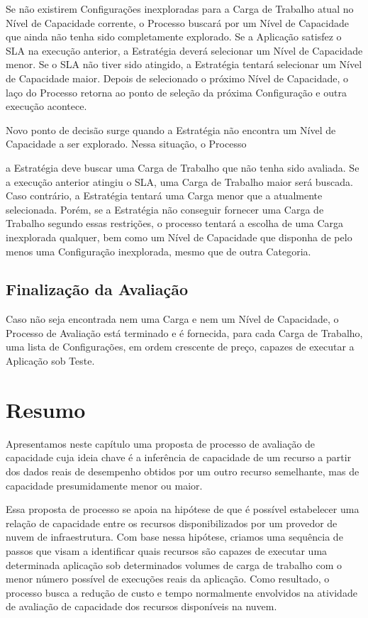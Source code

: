 Se não existirem Configurações inexploradas para a Carga de Trabalho atual no
Nível de Capacidade corrente, o Processo buscará por um Nível de Capacidade que 
ainda não tenha sido completamente explorado. Se a Aplicação satisfez o SLA na 
execução anterior, a Estratégia deverá selecionar um Nível de Capacidade menor. 
Se o SLA não tiver sido atingido, a Estratégia tentará selecionar um  Nível de 
Capacidade maior. Depois de selecionado o próximo Nível de Capacidade, o laço do
Processo retorna ao ponto de seleção da próxima Configuração e outra execução 
acontece.
   
Novo ponto de decisão surge quando a Estratégia não encontra um Nível de 
Capacidade a ser explorado. Nessa situação, o Processo  


a Estratégia deve buscar uma Carga 
de Trabalho que não tenha sido avaliada. Se a execução anterior atingiu o SLA,
uma Carga de Trabalho maior será buscada. Caso contrário, a Estratégia tentará
uma Carga menor que a atualmente selecionada. Porém, se a Estratégia não conseguir 
fornecer uma Carga de Trabalho segundo essas restrições, o processo tentará a 
escolha de uma Carga inexplorada qualquer, bem como um Nível de Capacidade que 
disponha de pelo menos uma Configuração inexplorada, mesmo que de outra Categoria.    

\subsection{Finalização da Avaliação}
Caso não seja encontrada nem uma Carga e nem um Nível de Capacidade, o Processo de 
Avaliação está terminado e é fornecida, para cada Carga de Trabalho, uma lista 
de Configurações, em ordem crescente de preço, capazes de executar a Aplicação 
sob Teste.

\section{Resumo}
Apresentamos neste capítulo uma proposta de processo de avaliação de capacidade
cuja ideia chave é a inferência de capacidade de um recurso a partir dos dados 
reais de desempenho obtidos por um outro recurso semelhante, mas de capacidade
presumidamente menor ou maior.

Essa proposta de processo se apoia na hipótese de que é possível estabelecer uma
relação de capacidade entre os recursos disponibilizados por um provedor de nuvem
de infraestrutura. Com base nessa hipótese, criamos uma sequência de passos que
visam a identificar quais recursos são capazes de executar uma determinada 
aplicação sob determinados volumes de carga de trabalho com o menor número
possível de execuções reais da aplicação. Como resultado, o processo busca
a redução de custo e tempo normalmente envolvidos na atividade de avaliação de
capacidade dos recursos disponíveis na nuvem.

